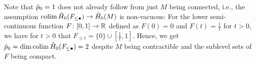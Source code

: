 \begin{rem}
    Note that $\check{p}_0 = 1$ does not already follow from just $M$ being connected, i.e., the assumption $\operatorname*{colim} \check{H}_0(F_{\leq \bullet}) \to \check{H}_0(M)$ is non-vacuous:
	For the lower semi-continuous function $F \colon [0,1] \to \mathbb{R}$ defined as $F(0) = 0$ and $F(t) = \frac1t$ for $t > 0$, we have for $t > 0$ that $F_{\leq t} = \{0\} \cup [\frac1t, 1]$.
	Hence, we get $\check{p}_0 = \dim \operatorname*{colim} \check{H}_0(F_{\leq \bullet}) = 2$ despite $M$ being contractible and the sublevel sets of $F$ being compact. %
    
    
    



\end{rem}
